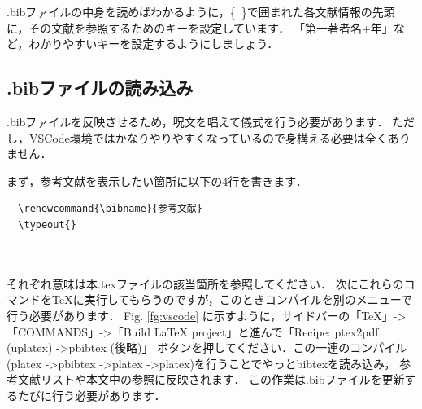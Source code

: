 \documentclass[11pt,a4j,onecolumn]{jsreport} %
\begin{document}
.bibファイルの中身を読めばわかるように，\{~\}で囲まれた各文献情報の先頭に，その文献を参照するためのキーを設定しています．
「第一著者名+年」など，わかりやすいキーを設定するようにしましょう．

\subsection{.bibファイルの読み込み}

.bibファイルを反映させるため，呪文を唱えて儀式を行う必要があります．
ただし，VSCode環境ではかなりやりやすくなっているので身構える必要は全くありません．

まず，参考文献を表示したい箇所に以下の4行を書きます．

\begin{verbatim}
  \renewcommand{\bibname}{参考文献}
  \typeout{}
  
  
\end{verbatim}

それぞれ意味は本.texファイルの該当箇所を参照してください．
次にこれらのコマンドを\TeX に実行してもらうのですが，このときコンパイルを別のメニューで行う必要があります．
Fig. \ref{fg:vscode} に示すように，サイドバーの「\TeX 」-\textgreater「COMMANDS」-\textgreater「Build LaTeX project」と進んで「Recipe: ptex2pdf (uplatex) -\textgreater pbibtex (後略)」
ボタンを押してください．この一連のコンパイル(platex -\textgreater pbibtex -\textgreater platex -\textgreater platex)を行うことでやっとbibtexを読み込み，
参考文献リストや本文中の参照に反映されます．
この作業は.bibファイルを更新するたびに行う必要があります．
\end{document}
